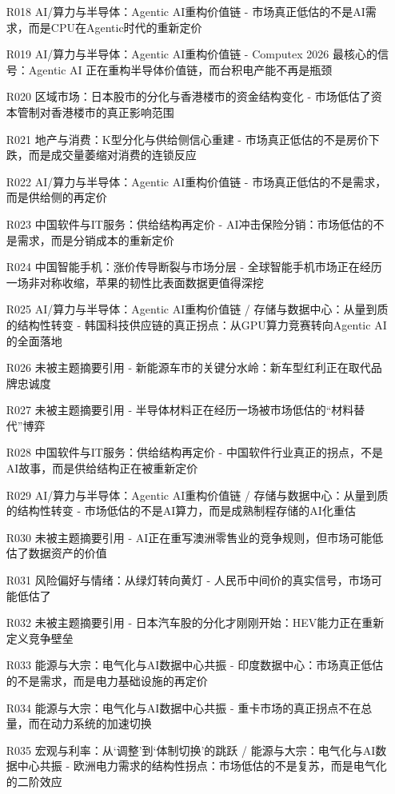 \documentclass[11pt]{ctexart}
\begin{document}
\begin{itemize}
  \item [R018] AI/算力与半导体：Agentic AI重构价值链 - 市场真正低估的不是AI需求，而是CPU在Agentic时代的重新定价
  \item [R019] AI/算力与半导体：Agentic AI重构价值链 - Computex 2026 最核心的信号：Agentic AI 正在重构半导体价值链，而台积电产能不再是瓶颈
  \item [R020] 区域市场：日本股市的分化与香港楼市的资金结构变化 - 市场低估了资本管制对香港楼市的真正影响范围
  \item [R021] 地产与消费：K型分化与供给侧信心重建 - 市场真正低估的不是房价下跌，而是成交量萎缩对消费的连锁反应
  \item [R022] AI/算力与半导体：Agentic AI重构价值链 - 市场真正低估的不是需求，而是供给侧的再定价
  \item [R023] 中国软件与IT服务：供给结构再定价 - AI冲击保险分销：市场低估的不是需求，而是分销成本的重新定价
  \item [R024] 中国智能手机：涨价传导断裂与市场分层 - 全球智能手机市场正在经历一场非对称收缩，苹果的韧性比表面数据更值得深挖
  \item [R025] AI/算力与半导体：Agentic AI重构价值链 / 存储与数据中心：从量到质的结构性转变 - 韩国科技供应链的真正拐点：从GPU算力竞赛转向Agentic AI的全面落地
  \item [R026] 未被主题摘要引用 - 新能源车市的关键分水岭：新车型红利正在取代品牌忠诚度
  \item [R027] 未被主题摘要引用 - 半导体材料正在经历一场被市场低估的“材料替代”博弈
  \item [R028] 中国软件与IT服务：供给结构再定价 - 中国软件行业真正的拐点，不是AI故事，而是供给结构正在被重新定价
  \item [R029] AI/算力与半导体：Agentic AI重构价值链 / 存储与数据中心：从量到质的结构性转变 - 市场低估的不是AI算力，而是成熟制程存储的AI化重估
  \item [R030] 未被主题摘要引用 - AI正在重写澳洲零售业的竞争规则，但市场可能低估了数据资产的价值
  \item [R031] 风险偏好与情绪：从绿灯转向黄灯 - 人民币中间价的真实信号，市场可能低估了
  \item [R032] 未被主题摘要引用 - 日本汽车股的分化才刚刚开始：HEV能力正在重新定义竞争壁垒
  \item [R033] 能源与大宗：电气化与AI数据中心共振 - 印度数据中心：市场真正低估的不是需求，而是电力基础设施的再定价
  \item [R034] 能源与大宗：电气化与AI数据中心共振 - 重卡市场的真正拐点不在总量，而在动力系统的加速切换
  \item [R035] 宏观与利率：从‘调整’到‘体制切换’的跳跃 / 能源与大宗：电气化与AI数据中心共振 - 欧洲电力需求的结构性拐点：市场低估的不是复苏，而是电气化的二阶效应

\end{itemize}
\end{document}
